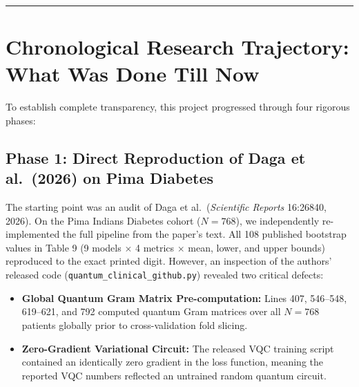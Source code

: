 \documentclass[11pt,a4paper]{article}
\newcommand{\code}[1]{\texttt{\small #1}}
\begin{document}
\vspace{-0.2cm}
\tableofcontents
\vspace{0.3cm}
\hrule
\clearpage

\section{Chronological Research Trajectory: What Was Done Till Now}
To establish complete transparency, this project progressed through four rigorous phases:

\subsection{Phase 1: Direct Reproduction of Daga et al.\ (2026) on Pima Diabetes}
The starting point was an audit of Daga et al.\ (\emph{Scientific Reports} 16:26840, 2026). On the Pima Indians Diabetes cohort ($N=768$), we independently re-implemented the full pipeline from the paper's text. All 108 published bootstrap values in Table 9 (9 models $\times$ 4 metrics $\times$ mean, lower, and upper bounds) reproduced to the exact printed digit. 
However, an inspection of the authors' released code (\code{quantum\_clinical\_github.py}) revealed two critical defects:
\begin{itemize}[leftmargin=1.5em,topsep=1pt,itemsep=1pt]
    \item \textbf{Global Quantum Gram Matrix Pre-computation:} Lines 407, 546--548, 619--621, and 792 computed quantum Gram matrices over all $N=768$ patients globally prior to cross-validation fold slicing.
    \item \textbf{Zero-Gradient Variational Circuit:} The released VQC training script contained an identically zero gradient in the loss function, meaning the reported VQC numbers reflected an untrained random quantum circuit.
\end{itemize}
\end{document}
